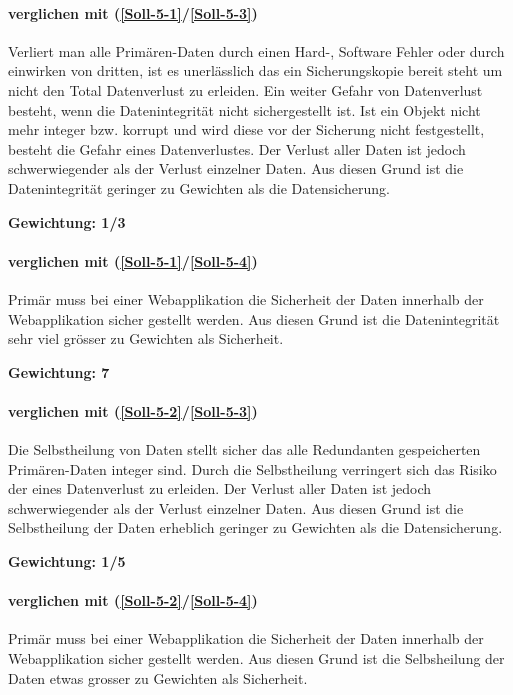 \paragraph*{ verglichen mit  (\ref{Soll-5-1}/\ref{Soll-5-3})}
Verliert man alle \gls{Primären-Daten} durch einen Hard-, Software Fehler oder durch einwirken von dritten, ist es unerlässlich das ein Sicherungskopie bereit steht um nicht den Total Datenverlust zu erleiden.
Ein weiter Gefahr von Datenverlust besteht, wenn die Datenintegrität nicht sichergestellt ist. Ist ein Objekt nicht mehr integer bzw. korrupt und wird diese vor der Sicherung nicht festgestellt, besteht die Gefahr eines Datenverlustes.
Der Verlust aller Daten ist jedoch schwerwiegender als der Verlust einzelner Daten.
Aus diesen Grund ist die Datenintegrität geringer zu Gewichten als die Datensicherung.

\textbf{Gewichtung: 1/3}

\paragraph*{ verglichen mit  (\ref{Soll-5-1}/\ref{Soll-5-4})}
Primär muss bei einer Webapplikation die Sicherheit der Daten innerhalb der Webapplikation sicher gestellt werden. Aus diesen Grund ist die Datenintegrität sehr viel grösser zu Gewichten als Sicherheit.

\textbf{Gewichtung: 7}

\paragraph*{ verglichen mit  (\ref{Soll-5-2}/\ref{Soll-5-3})}
Die Selbstheilung von Daten stellt sicher das alle Redundanten gespeicherten \gls{Primären-Daten} integer sind. Durch die Selbstheilung verringert sich das Risiko der eines Datenverlust zu erleiden. 
Der Verlust aller Daten ist jedoch schwerwiegender als der Verlust einzelner Daten.
Aus diesen Grund ist die Selbstheilung der Daten erheblich geringer zu Gewichten als die Datensicherung.

\textbf{Gewichtung: 1/5}

\paragraph*{ verglichen mit  (\ref{Soll-5-2}/\ref{Soll-5-4})}
Primär muss bei einer Webapplikation die Sicherheit der Daten innerhalb der Webapplikation sicher gestellt werden. Aus diesen Grund ist die Selbsheilung der Daten etwas grosser zu Gewichten als Sicherheit.

